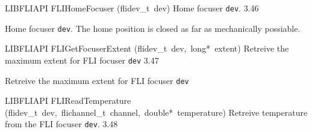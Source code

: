 \documentclass{article}
\begin{document}
\begin{cxxentry}
\begin{cxxfunction}
\begin{cxxdoc}
\end{cxxdoc}
\end{cxxfunction}
\begin{cxxfunction}
{LIBFLIAPI}
        {FLIHomeFocuser}
        {(flidev\_t\ dev)}
        { Home focuser \texttt{dev}.}
        {3.46}
\begin{cxxdoc}

Home focuser \texttt{dev}. The home position is closed as far as mechanically possiable.


\end{cxxdoc}
\end{cxxfunction}
\begin{cxxfunction}
{LIBFLIAPI}
        {FLIGetFocuserExtent}
        {(flidev\_t\ dev,\ long*\ extent)}
        { Retreive the maximum extent for FLI focuser \texttt{dev}  }
        {3.47}
\begin{cxxdoc}

Retreive the maximum extent for FLI focuser \texttt{dev}


\end{cxxdoc}
\end{cxxfunction}
\begin{cxxfunction}
{LIBFLIAPI}
        {FLIReadTemperature}
        {(flidev\_t\ dev,\ flichannel\_t\ channel,\ double*\ temperature)}
        { Retreive temperature from the FLI focuser \texttt{dev}.}
        {3.48}
\begin{cxxdoc}


\end{cxxdoc}
\end{cxxfunction}
\end{cxxentry}
\end{document}

